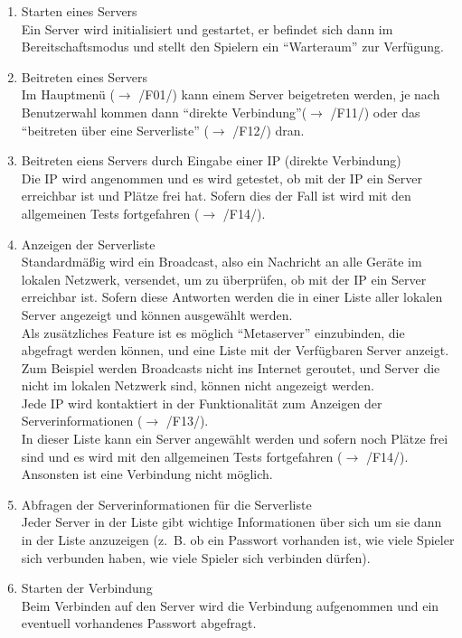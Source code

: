 \documentclass[a4paper,10pt]{article}
\begin{document}
\begin{enumerate}[/F01/]
\item Starten eines Servers \\
Ein Server wird initialisiert und gestartet, er befindet sich dann im Bereitschaftsmodus und stellt den Spielern ein ``Warteraum'' zur Verfügung.

\item Beitreten eines Servers \\
Im Hauptmenü ($\rightarrow$ /F01/) kann einem Server beigetreten werden, je nach Benutzerwahl kommen dann ``direkte Verbindung''($\rightarrow$ /F11/) oder das ``beitreten über eine Serverliste'' ($\rightarrow$ /F12/) dran.

\item Beitreten eiens Servers durch Eingabe einer IP (direkte Verbindung) \\
Die IP wird angenommen und es wird getestet, ob mit der IP ein Server erreichbar ist und Plätze frei hat. Sofern dies der Fall ist wird mit den allgemeinen Tests fortgefahren ($\rightarrow$ /F14/).

\item Anzeigen der Serverliste \\
Standardmäßig wird ein Broadcast, also ein Nachricht an alle Geräte im lokalen Netzwerk, versendet, um zu überprüfen, ob mit der IP ein Server erreichbar ist. Sofern diese Antworten werden die in einer Liste aller lokalen Server angezeigt und können ausgewählt werden. \\

Als zusätzliches Feature ist es möglich ``Metaserver'' einzubinden, die abgefragt werden können, und eine Liste mit der Verfügbaren Server anzeigt. Zum Beispiel werden Broadcasts nicht ins Internet geroutet, und Server die nicht im lokalen Netzwerk sind, können nicht angezeigt werden. \\

Jede IP wird kontaktiert in der Funktionalität zum Anzeigen der Serverinformationen ($\rightarrow$ /F13/). \\

In dieser Liste kann ein Server angewählt werden und sofern noch Plätze frei sind und es wird mit den allgemeinen Tests fortgefahren ($\rightarrow$ /F14/). Ansonsten ist eine Verbindung nicht möglich.
\item Abfragen der Serverinformationen für die Serverliste \\
Jeder Server in der Liste gibt wichtige Informationen über sich um sie dann in der Liste anzuzeigen (z.~B. ob ein Passwort vorhanden ist, wie viele Spieler sich verbunden haben, wie viele Spieler sich verbinden dürfen).
\item Starten der Verbindung \\
Beim Verbinden auf den Server wird die Verbindung aufgenommen und ein eventuell vorhandenes Passwort abgefragt.
\end{enumerate}
\end{document}
